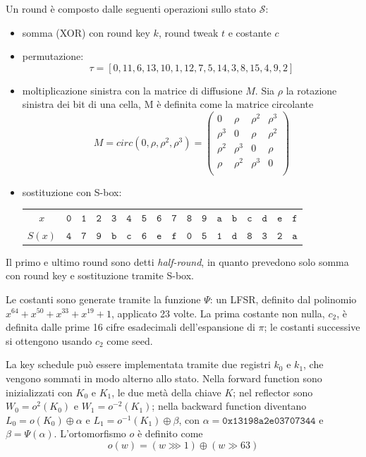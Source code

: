 \documentclass[target=bach,aauheader=,style=]{thud}
\begin{document}
			Un round è composto dalle seguenti operazioni sullo stato $\mathcal{S}$:
			\begin{itemize}
				\item somma (XOR) con round key $k$, round tweak $t$ e costante $c$
				\item permutazione:
				\[\tau = [0,11,6,13,10,1,12,7,5,14,3,8,15,4,9,2]\]
				\item moltiplicazione sinistra con la matrice di diffusione $M$.
				Sia $\rho$ la rotazione sinistra dei bit di una cella, M è definita come la matrice circolante
				\[M =  circ(0, \rho, \rho ^2, \rho ^3) =
				\begin{pmatrix}
					0 & \rho & \rho ^2 & \rho ^3 \\
					\rho ^3 & 0 & \rho & \rho ^2 \\
					\rho ^2 & \rho ^3 & 0 & \rho \\
					\rho & \rho ^2 & \rho ^3 & 0 \\
				\end{pmatrix}
				\]
				\item sostituzione con S-box:
				\begin{center}
					\begin{tabular}{|c|cccccccccccccccc|}
						\hline
						$x$ & $\mathtt{0}$ & $\mathtt{1}$ & $\mathtt{2}$ & $\mathtt{3}$ & $\mathtt{4}$ & $\mathtt{5}$ & $\mathtt{6}$ & $\mathtt{7}$ & $\mathtt{8}$ & $\mathtt{9}$ & $\mathtt{a}$ & $\mathtt{b}$ & $\mathtt{c}$ & $\mathtt{d}$ & $\mathtt{e}$ & $\mathtt{f}$\\
						$S(x)$ & $\mathtt{4}$ & $\mathtt{7}$ & $\mathtt{9}$ & $\mathtt{b}$ & $\mathtt{c}$ & $\mathtt{6}$ & $\mathtt{e}$ & $\mathtt{f}$ & $\mathtt{0}$ & $\mathtt{5}$ & $\mathtt{1}$ & $\mathtt{d}$ & $\mathtt{8}$ & $\mathtt{3}$ & $\mathtt{2}$ & $\mathtt{a}$\\
						\hline
					\end{tabular}
				\end{center}
			\end{itemize}
			Il primo e ultimo round sono detti \textit{half-round}, in quanto prevedono solo somma con round key e sostituzione tramite S-box.
			
			Le costanti sono generate tramite la funzione $\Psi$: un LFSR, definito dal polinomio $x^{64} + x^{50} + x^{33} + x^{19} + 1$, applicato 23 volte. La prima costante non nulla, $c_2$, è definita dalle prime 16 cifre esadecimali dell'espansione di $\pi$; le costanti successive si ottengono usando $c_2$ come seed.
			
			La key schedule può essere implementata tramite due registri $k_0$ e $k_1$, che vengono sommati in modo alterno allo stato. Nella forward function sono inizializzati con $K_0$ e $K_1$, le due metà della chiave $K$; nel reflector sono $W_0 = o^2(K_0)$ e $W_1 = o^{-2}(K_1)$; nella backward function diventano $L_0 = o(K_0) \oplus \alpha$ e $L_1 = o^{-1}(K_1) \oplus \beta$, con $\alpha = \mathtt{0x13198a2e03707344}$ e $\beta = \Psi(\alpha)$. L'ortomorfismo $o$ è definito come
			\[o(w) = (w \ggg 1) \oplus (w \gg 63)\]
			
\end{document}
